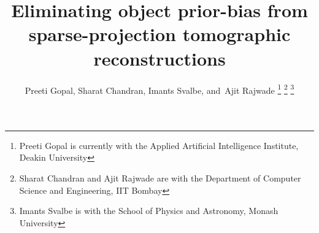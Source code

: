 \documentclass[journal]{IEEEtran}
\begin{document}
%
\title{Eliminating object prior-bias from sparse-projection tomographic reconstructions}
%
%
%

\author{Preeti Gopal,
  Sharat Chandran,
  Imants Svalbe,
        and~Ajit Rajwade
\thanks{Preeti Gopal is currently with the Applied Artificial Intelligence Institute, Deakin University}
\thanks{Sharat Chandran and Ajit Rajwade are with the Department of Computer Science and Engineering, IIT Bombay}
\thanks{Imants Svalbe is with the School of Physics and Astronomy, Monash University}}



\maketitle
\end{document}
